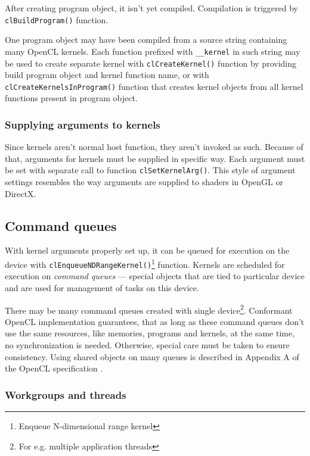 After creating program object, it isn't yet compiled. Compilation is triggered
by \texttt{cl\-Build\-Program()} function.

One program object may have been compiled from a source string containing many
OpenCL kernels. Each function prefixed with \texttt{\_\_kernel} in such string
may be used to create separate kernel with \texttt{clCreate\-Kernel()} function by
providing build program object and kernel function name, or with
\texttt{clCreateKernelsInProgram()} function that creates kernel objects from
all kernel functions present in program object.

\subsubsection{Supplying arguments to kernels}

Since kernels aren't normal host function, they aren't invoked as such. Because
of that, arguments for kernels must be supplied in specific way. Each argument
must be set with separate call to function \texttt{clSetKernelArg()}. This style
of argument settings resembles the way arguments are supplied to shaders in OpenGL
or DirectX.

\subsection{Command queues}

With kernel arguments properly set up, it can be queued for execution on the
device with \texttt{clEnqueueNDRangeKernel()}\footnote{Enqueue N-dimensional range kernel}
function. Kernels are scheduled for execution on \emph{command queues} --- special
objects that are tied to particular device and are used for management of tasks
on this device.

There may be many command queues created with single
device\footnote{For e.g. multiple application threads}. Conformant OpenCL
implementation guarantees, that as long as these command queues don't use the
same resources, like memories, programs and kernels, at the same time, no
synchronization is needed. Otherwise, special care must be taken to ensure
consistency. Using shared objects on many queues is described in Appendix A
of the OpenCL specification \parencite{openclspec}.

\subsubsection{Workgroups and threads}
\label{subsub:clworkgroups}

